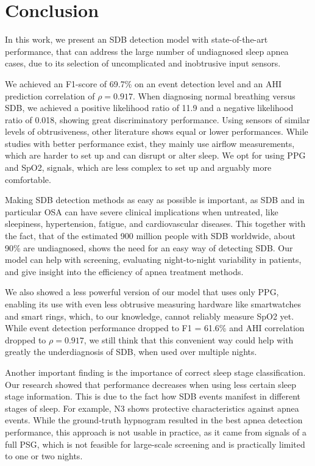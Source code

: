 \chapter{Conclusion \label{Chapter-Conclusion}}

In this work, we present an SDB detection model with state-of-the-art performance, that can address the large number of undiagnosed sleep apnea cases, due to its selection of uncomplicated and inobtrusive input sensors.

We achieved an F1-score of 69.7\% on an event detection level and an AHI prediction correlation of $\rho = 0.917$. When diagnosing normal breathing versus SDB, we achieved a positive likelihood ratio of 11.9 and a negative likelihood ratio of 0.018, showing great discriminatory performance.
Using sensors of similar levels of obtrusiveness, other literature shows equal or lower performances. 
While studies with better performance exist, they mainly use airflow measurements, which are harder to set up and can disrupt or alter sleep. We opt for using PPG and SpO2, signals, which are less complex to set up and arguably more comfortable.

Making SDB detection methods as easy as possible is important, as SDB and in particular OSA can have severe clinical implications when untreated, like sleepiness, hypertension, fatigue, and cardiovascular diseases. This together with the fact, that of the estimated 900 million people with SDB worldwide, about 90\% are undiagnosed, shows the need for an easy way of detecting SDB. Our model can help with screening, evaluating night-to-night variability in patients, and give insight into the efficiency of apnea treatment methods.

We also showed a less powerful version of our model that uses only PPG, enabling its use with even less obtrusive measuring hardware like smartwatches and smart rings, which, to our knowledge, cannot reliably measure SpO2 yet.
While event detection performance dropped to F1 = 61.6\% and AHI correlation dropped to $\rho = 0.917$, we still think that this convenient way could help with greatly the underdiagnosis of SDB, when used over multiple nights. 

Another important finding is the importance of correct sleep stage classification. Our research showed that performance decreases when using less certain sleep stage information. This is due to the fact how SDB events manifest in different stages of sleep. For example, N3 shows protective characteristics against apnea events. While the ground-truth hypnogram resulted in the best apnea detection performance, this approach is not usable in practice, as it came from signals of a full PSG, which is not feasible for large-scale screening and is practically limited to one or two nights.


